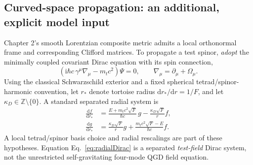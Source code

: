 \documentclass[11pt,a4paper]{article}
\theoremstyle{remark}
\newcommand{\dd}{\mathrm d}
\newcommand{\ii}{\mathrm i}
\newcommand{\eref}[1]{Eq.~\eqref{#1}}
\begin{document}
\subsection{Curved-space propagation: an additional, explicit model input}
Chapter 2's smooth Lorentzian composite metric admits a local orthonormal frame and corresponding Clifford matrices. To propagate a test spinor, \emph{adopt} the minimally coupled covariant Dirac equation with its spin connection,
\begin{equation}\label{eq:curvedDirac}
 (\ii\hbar c\,\gamma^\mu\nabla_\mu-m_tc^2)\Psi=0,
 \qquad \nabla_\mu=\partial_\mu+\Omega_\mu.
\end{equation}
Using the classical Schwarzschild exterior and a fixed spherical tetrad/spinor-harmonic convention, let $r_*$ denote tortoise radius $\dd r_*/\dd r=1/F$, and let $\kappa_D\in\mathbb Z\setminus\{0\}$. A standard separated radial system is
\begin{equation}\label{eq:radialDirac}
\begin{aligned}
\frac{\dd f}{\dd r_*}&=\frac{E+m_tc^2\sqrt F}{\hbar c}\,g-\frac{\kappa_D\sqrt F}{r}f,\\
\frac{\dd g}{\dd r_*}&=\frac{\kappa_D\sqrt F}{r}g+\frac{m_tc^2\sqrt F-E}{\hbar c}f.
\end{aligned}
\end{equation}
A local tetrad/spinor basis choice and radial rescalings are part of these hypotheses. Equation \eref{eq:radialDirac} is a separated \emph{test-field} Dirac system, not the unrestricted self-gravitating four-mode QGD field equation.
\end{document}
